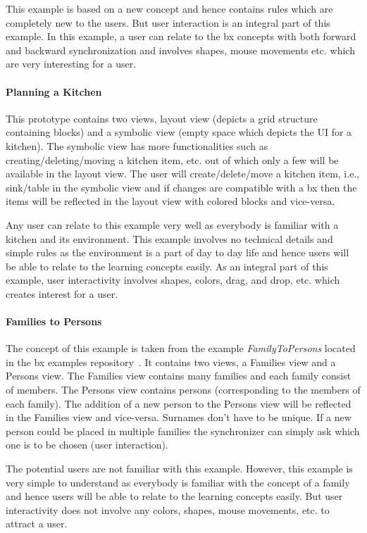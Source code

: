 This example is based on a new concept and hence contains rules which are completely new to the users. But user interaction is an integral part of this example. In this example, a user can relate to the bx concepts with both forward and backward synchronization and involves shapes, mouse movements etc. which are very interesting for a user.

\paragraph{Planning a Kitchen}
This prototype contains two views, layout view (depicts a grid structure containing blocks) and a symbolic view (empty space which depicts the UI for a kitchen). The symbolic view has more functionalities such as creating/deleting/moving a kitchen item, etc. out of which only a few will be available in the layout view. The user will create/delete/move a kitchen item, i.e., sink/table in the symbolic view and if changes are compatible with a bx then the items will be reflected in the layout view with colored blocks and vice-versa.

Any user can relate to this example very well as everybody is familiar with a kitchen and its environment. This example involves no technical details and simple rules as the environment is a part of day to day life and hence users will be able to relate to the learning concepts easily. As an integral part of this example, user interactivity involves shapes, colors, drag, and drop, etc. which creates interest for a user.

\paragraph{Families to Persons}
The concept of this example is taken from the example \emph{FamilyToPersons} located in the bx examples repository~\cite{bx-examples}. It contains two views, a Families view and a Persons view. The Families view contains many families and each family consist of members. The Persons view contains persons (corresponding to the members of each family). The addition of a new person to the Persons view will be reflected in the Families view and vice-versa. Surnames don't have to be unique. If a new person could be placed in multiple families the synchronizer can simply ask which one is to be chosen (user interaction).

The potential users are not familiar with this example. However, this example is very simple to understand as everybody is familiar with the concept of a family and hence users will be able to relate to the learning concepts easily. But user interactivity does not involve any colors, shapes, mouse movements, etc. to attract a user.

